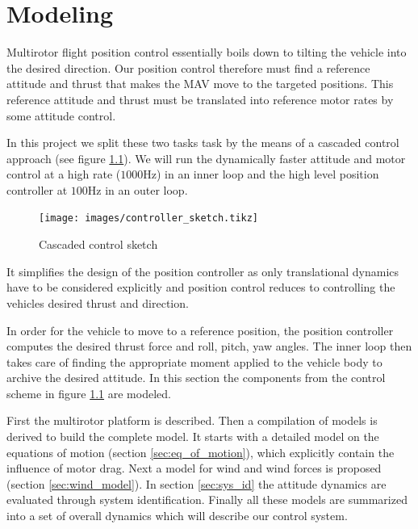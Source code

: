 \chapter{Modeling}
\label{sec:modeling}
Multirotor flight position control essentially boils down to tilting the vehicle into the desired direction. Our position control therefore must find a reference attitude and thrust that makes the MAV move to the targeted positions. This reference attitude and thrust must be translated into reference motor rates by some attitude control. 

In this project we split these two tasks task by the means of a cascaded control approach (see figure \ref{pics:controller_sketch}). We will run the dynamically faster attitude and motor control at a high rate ($1000 \si{\hertz}$) in an inner loop and the high level position controller at $100 \si{\hertz}$ in an outer loop. 
\begin{figure}
\centering
\texttt{[image: images/controller\_sketch.tikz]}
\caption{Cascaded control sketch}
\label{pics:controller_sketch}
\end{figure}

It simplifies the design of the position controller as only translational dynamics have to be considered explicitly and position control reduces to controlling the vehicles desired thrust and direction. 

In order for the vehicle to move to a reference position, the position controller computes the desired thrust force and roll, pitch, yaw angles. The inner loop then takes care of finding the appropriate moment applied to the vehicle body to archive the desired attitude. In this section the components from the control scheme in figure \ref{pics:controller_sketch} are modeled. 


First the multirotor platform is described. Then a compilation of models is derived to build the complete model. It starts with a detailed model on the equations of motion (section \ref{sec:eq_of_motion}), which explicitly contain the influence of motor drag. Next a model for wind and wind forces is proposed (section \ref{sec:wind_model}). In section \ref{sec:sys_id} the attitude dynamics are evaluated through system identification. Finally all these models are summarized into a set of overall dynamics which will describe our control system.

